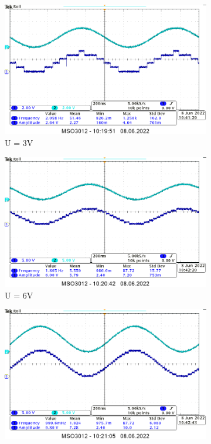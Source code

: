 \begin{itemize}
\begin{figure}[H]
\begin{subfigure}[H]{0.45\textwidth}
            \end{subfigure}
            \begin{subfigure}[H]{0.45\textwidth}
                \includegraphics[width=\textwidth]{img/3/3_rozdzielczosc_3V_cropped.png}
                \caption*{U = 3V}
            \end{subfigure}
            \begin{subfigure}[H]{0.45\textwidth}
                \includegraphics[width=\textwidth]{img/3/3_rozdzielczosc_6V_cropped.png}
                \caption*{U = 6V}
            \end{subfigure}
            \begin{subfigure}[H]{0.45\textwidth}
                \includegraphics[width=\textwidth]{img/3/3_rozdzielczosc_10V_cropped.png}

\end{subfigure}
\end{figure}
\end{itemize}
